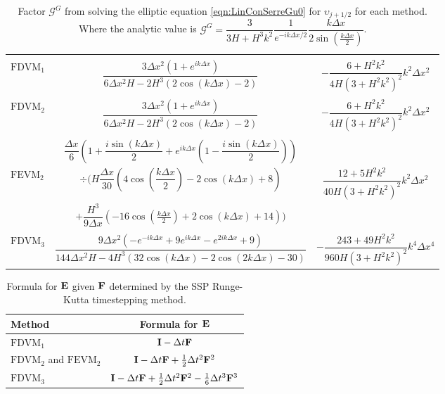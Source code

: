 \begin{landscape}
\begin{table}
\begin{tabular}{l  c  c}
		\hline  \\
		$\text{FDVM}_1$& $\dfrac{3 \Delta x^2 \left({1 + e^{ik\Delta x}}\right)}{6 \Delta x^2 H - 2H^3 \left(2\cos\left(k\Delta x\right) - 2\right)}$ & $-\dfrac{6 +H^2k^2}{4H \left(3 + H^2k^2\right)^2}k^2 \Delta x^2$  \\ \\
		$\text{FDVM}_2$& $\dfrac{3 \Delta x^2 \left({1 + e^{ik\Delta x}}\right)}{6 \Delta x^2 H - 2H^3 \left(2\cos\left(k\Delta x\right) - 2\right)}$ & $-\dfrac{6 +H^2k^2}{4H \left(3 + H^2k^2\right)^2}k^2 \Delta x^2$  \\ \\
		& $\dfrac{\Delta x}{6} \left(1 + \dfrac{i \sin\left(k \Delta x\right)}{2} + e^{ik\Delta x}\left(1 - \dfrac{i \sin\left(k \Delta x\right)}{2}\right) \right)$ & \\  $\text{FEVM}_2$ & $\div  \Bigg( H\dfrac{\Delta x}{30} \left(4\cos\left(\dfrac{k \Delta x}{2}\right) - 2\cos\left({k \Delta x}\right) + 8\right) $  & $\dfrac{12 + 5H^2k^2}{40H \left(3 + H^2k^2\right)^2}k^2 \Delta x^2$ \\ &$+ \dfrac{H^3 }{9\Delta x}\left(-16\cos\left(\frac{k\Delta x}{2}\right) + 2 \cos\left(k \Delta x\right) + 14\right)    \Bigg)$ & \\ \\
		$\text{FDVM}_3$&  $\dfrac{9 \Delta x^2 \left({-e^{-ik\Delta x} + 9e^{ik\Delta x} - e^{2ik\Delta x} + 9}\right)}{144 \Delta x^2H - 4H^3\left(32\cos\left(k \Delta x\right) -2\cos\left(2k \Delta x\right) - 30\right)}$ & $-\dfrac{243 + 49H^2k^2}{960H\left(3 + H^2k^2\right)^2}k^4 \Delta x^4$  \T \B \\ 
		\hline
	\end{tabular}
	\caption{Factor $\mathcal{G}^G$ from solving the elliptic equation \eqref{eqn:LinConSerreGu0} for $\upsilon_{j+1/2}$ for each method. Where the analytic value is  $\mathcal{G}^G = \dfrac{3}{3H + H^3k^2} \dfrac{1}{e^{-ik\Delta x/2}} \dfrac{k\Delta x}{2 \sin\left(\frac{k \Delta x}{2}\right)}$.}
	\label{tab:GGfactor} 
\end{table}
\end{landscape}
%
\begin{table}
	\centering
	\begin{tabular}{l  c}
		Method & Formula for $\mathbf{E}$  \T\B \\
		\hline 
		$\text{FDVM}_1$& $\mathbf{I} - \Delta t\mathbf{F} $  \T\B \\
		$\text{FDVM}_2$ and $\text{FEVM}_2$ & $ \mathbf{I}  -\Delta t\mathbf{F} + \frac{1}{2}\Delta t^2\mathbf{F}^2$  \T\B \\
		$\text{FDVM}_3$& $\mathbf{I} -\Delta t\mathbf{F} + \frac{1}{2}\Delta t^2 \mathbf{F}^2 - \frac{1}{6}\Delta t^3 \mathbf{F}^3 $  \T\B \\
		\hline
	\end{tabular}
	\caption{Formula for $\mathbf{E}$ given $\mathbf{F}$ determined by the SSP Runge-Kutta timestepping method.}
	\label{tab:RKstepfactor}
\end{table}

